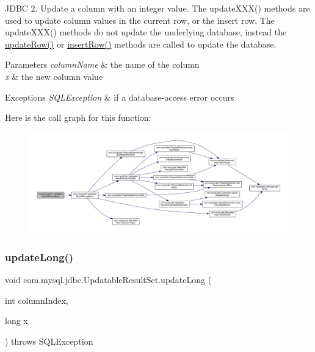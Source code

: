 J\+D\+BC 2. Update a column with an integer value. The update\+X\+X\+X() methods are used to update column values in the current row, or the insert row. The update\+X\+X\+X() methods do not update the underlying database, instead the \mbox{\hyperlink{classcom_1_1mysql_1_1jdbc_1_1_updatable_result_set_a919969ba4b3c7cbc7b18605e9f31a746}{update\+Row()}} or \mbox{\hyperlink{classcom_1_1mysql_1_1jdbc_1_1_updatable_result_set_aef041f8d9d0778083716fc26652648fa}{insert\+Row()}} methods are called to update the database.


\begin{DoxyParams}{Parameters}
{\em column\+Name} & the name of the column \\
\hline
{\em x} & the new column value\\
\hline
\end{DoxyParams}

\begin{DoxyExceptions}{Exceptions}
{\em S\+Q\+L\+Exception} & if a database-\/access error occurs \\
\hline
\end{DoxyExceptions}
Here is the call graph for this function\+:
\nopagebreak
\begin{figure}[H]
\begin{center}
\leavevmode
\includegraphics[width=350pt]{classcom_1_1mysql_1_1jdbc_1_1_updatable_result_set_a8a46dadedadd27401fd4fdd849b1ac2f_cgraph}
\end{center}
\end{figure}
\mbox{\label{classcom_1_1mysql_1_1jdbc_1_1_updatable_result_set_a53f2a28ae9fde4bd075d46a0b94dab63}} 
\subsubsection{\texorpdfstring{update\+Long()}{updateLong()}\hspace{0.1cm}{\footnotesize\ttfamily [1/2]}}
{\footnotesize\ttfamily void com.\+mysql.\+jdbc.\+Updatable\+Result\+Set.\+update\+Long (\begin{DoxyParamCaption}\item[{int}]{column\+Index,  }\item[{long}]{x }\end{DoxyParamCaption}) throws S\+Q\+L\+Exception}

